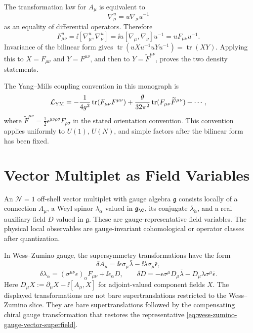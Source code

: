 The transformation law for \(A_\mu\) is equivalent to
\[
  \nabla_\mu^u=u\nabla_\mu u^{-1}
\]
as an equality of differential operators.  Therefore
\[
  F_{\mu\nu}^u
  =
  \ii[\nabla_\mu^u,\nabla_\nu^u]
  =
  \ii u[\nabla_\mu,\nabla_\nu]u^{-1}
  =
  uF_{\mu\nu}u^{-1}.
\]
Invariance of the bilinear form gives
\(\operatorname{tr}(uXu^{-1}uYu^{-1})=\operatorname{tr}(XY)\).  Applying
this to \(X=F_{\mu\nu}\) and \(Y=F^{\mu\nu}\), and then to
\(Y=\widetilde F^{\mu\nu}\), proves the two density statements.

The Yang--Mills coupling convention in this monograph is
\[
  \mathcal L_{\rm YM}
  =
  -\frac{1}{4g^2}\operatorname{tr}(F_{\mu\nu}F^{\mu\nu})
  +\frac{\theta}{32\pi^2}
  \operatorname{tr}(F_{\mu\nu}\widetilde F^{\mu\nu})
  +\cdots ,
\]
where \(\widetilde F^{\mu\nu}=\frac12
\epsilon^{\mu\nu\rho\sigma}F_{\rho\sigma}\) in the stated orientation
convention.  This convention applies uniformly to \(U(1)\), \(U(N)\), and
simple factors after the bilinear form has been fixed.

\section{Vector Multiplet as Field Variables}

\begin{definition}
\label{def:off-shell-vector-multiplet}
An \(\mathcal N=1\) off-shell vector multiplet with gauge algebra
\(\mathfrak g\) consists locally of a connection \(A_\mu\), a Weyl spinor
\(\lambda_\alpha\) valued in \(\mathfrak g_\C\), its conjugate
\(\bar\lambda_{\dot\alpha}\), and a real auxiliary field \(D\) valued in
\(\mathfrak g\).  These are gauge-representative field variables.  The
physical local observables are gauge-invariant cohomological or operator
classes after quantization.
\end{definition}

In Wess--Zumino gauge, the supersymmetry transformations have the form
\[
  \delta A_\mu
  =
  \ii\epsilon\sigma_\mu\bar\lambda
  -\ii\lambda\sigma_\mu\bar\epsilon ,
\]
\[
  \delta\lambda_\alpha
  =
  (\sigma^{\mu\nu}\epsilon)_\alpha F_{\mu\nu}
  +\ii\epsilon_\alpha D,
  \qquad
  \delta D
  =
  -\epsilon\sigma^\mu D_\mu\bar\lambda
  -D_\mu\lambda\sigma^\mu\bar\epsilon .
\]
Here \(D_\mu X:=\partial_\mu X-\ii[A_\mu,X]\) for adjoint-valued component
fields \(X\).  The displayed transformations are not bare supertranslations
restricted to the Wess--Zumino slice.  They are bare supertranslations
followed by the compensating chiral gauge transformation that restores the
representative \eqref{eq:wess-zumino-gauge-vector-superfield}.

